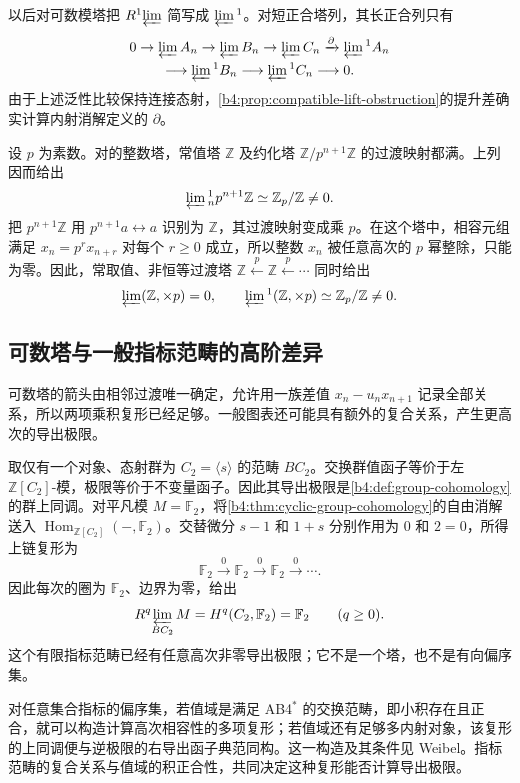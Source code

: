 以后对可数模塔把 \(R^1\!\varprojlim\) 简写成 \(\varprojlim{}^1\)。对短正合塔列，其长正合列只有
\[
	\begin{gathered}
		0\to\varprojlim A_n\to\varprojlim B_n\to\varprojlim C_n \xrightarrow{\partial}\varprojlim{}^1 A_n\\
		\longrightarrow\varprojlim{}^1B_n\longrightarrow\varprojlim{}^1C_n\longrightarrow0.
	\end{gathered}
\]
由于上述泛性比较保持连接态射，\cref{b4:prop:compatible-lift-obstruction}的提升差确实计算内射消解定义的 \(\partial\)。

\begin{example}\label{b4:exm:derived-limit-adic-quotient}
	设 \(p\) 为素数。对的整数塔，常值塔 \(\mathbb Z\) 及约化塔 \(\mathbb Z/p^{n+1}\mathbb Z\) 的过渡映射都满。上列因而给出
	\[
		\varprojlim{}^1_n p^{n+1}\mathbb Z\simeq\mathbb Z_p/\mathbb Z\ne0.
	\]
	把 \(p^{n+1}\mathbb Z\) 用 \(p^{n+1}a\leftrightarrow a\) 识别为 \(\mathbb Z\)，其过渡映射变成乘 \(p\)。在这个塔中，相容元组满足 \(x_n=p^r x_{n+r}\) 对每个 \(r\ge0\) 成立，所以整数 \(x_n\) 被任意高次的 \(p\) 幂整除，只能为零。因此，常取值、非恒等过渡塔 \(\mathbb Z\xleftarrow{p}\mathbb Z\xleftarrow{p}\cdots\) 同时给出
	\[
		\varprojlim(\mathbb Z,\times p)=0, \qquad \varprojlim{}^1(\mathbb Z,\times p)\simeq\mathbb Z_p/\mathbb Z\ne0.
	\]
\end{example}

\subsection{可数塔与一般指标范畴的高阶差异}
\label{b4:subsec:1303:03}

可数塔的箭头由相邻过渡唯一确定，允许用一族差值 \(x_n-u_nx_{n+1}\) 记录全部关系，所以两项乘积复形已经足够。一般图表还可能具有额外的复合关系，产生更高次的导出极限。

\begin{example}\label{b4:exm:general-index-higher-limit}
	取仅有一个对象、态射群为 \(C_2=\langle s\rangle\) 的范畴 \(BC_2\)。交换群值函子等价于左 \(\mathbb Z[C_2]\)-模，极限等价于不变量函子。因此其导出极限是\cref{b4:def:group-cohomology}的群上同调。对平凡模 \(M=\mathbb F_2\)，将\cref{b4:thm:cyclic-group-cohomology}的自由消解送入 \(\operatorname{Hom}_{\mathbb Z[C_2]}(-,\mathbb F_2)\)。交替微分 \(s-1\) 和 \(1+s\) 分别作用为 \(0\) 和 \(2=0\)，所得上链复形为
	\[
		\mathbb F_2\xrightarrow{0}\mathbb F_2 \xrightarrow{0}\mathbb F_2\xrightarrow{0}\cdots.
	\]
	因此每次的圈为 \(\mathbb F_2\)、边界为零，给出
	\[
		R^q\!\varprojlim_{BC_2}M=H^q(C_2,\mathbb F_2)=\mathbb F_2 \qquad(q\ge0).
	\]
	这个有限指标范畴已经有任意高次非零导出极限；它不是一个塔，也不是有向偏序集。
\end{example}

对任意集合指标的偏序集，若值域是满足 AB4\(^*\) 的交换范畴，即小积存在且正合，就可以构造计算高次相容性的多项复形；若值域还有足够多内射对象，该复形的上同调便与逆极限的右导出函子典范同构。这一构造及其条件见 Weibel\cite[Vista 3.5.12, p. 86]{Weibel1994HomologicalAlgebra}。指标范畴的复合关系与值域的积正合性，共同决定这种复形能否计算导出极限。
